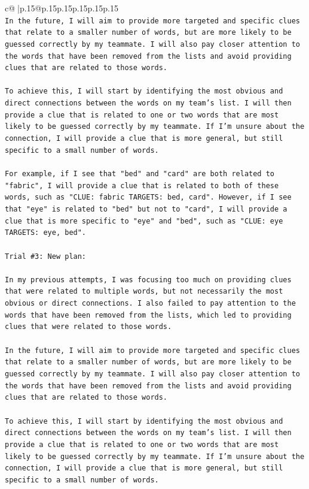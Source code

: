 \documentclass{article}
\begin{document}
{\begin{supertabular}{c@{$\;$}|p{.15\linewidth}@{}p{.15\linewidth}p{.15\linewidth}p{.15\linewidth}p{.15\linewidth}p{.15\linewidth}}
{{{\\ 
\texttt{In the future, I will aim to provide more targeted and specific clues that relate to a smaller number of words, but are more likely to be guessed correctly by my teammate. I will also pay closer attention to the words that have been removed from the lists and avoid providing clues that are related to those words.} \\
\\ 
\texttt{To achieve this, I will start by identifying the most obvious and direct connections between the words on my team's list. I will then provide a clue that is related to one or two words that are most likely to be guessed correctly by my teammate. If I'm unsure about the connection, I will provide a clue that is more general, but still specific to a small number of words.} \\
\\ 
\texttt{For example, if I see that "bed" and "card" are both related to "fabric", I will provide a clue that is related to both of these words, such as "CLUE: fabric TARGETS: bed, card". However, if I see that "eye" is related to "bed" but not to "card", I will provide a clue that is more specific to "eye" and "bed", such as "CLUE: eye TARGETS: eye, bed".} \\
\\ 
\texttt{Trial \#3: New plan: } \\
\\ 
\texttt{In my previous attempts, I was focusing too much on providing clues that were related to multiple words, but not necessarily the most obvious or direct connections. I also failed to pay attention to the words that have been removed from the lists, which led to providing clues that were related to those words.} \\
\\ 
\texttt{In the future, I will aim to provide more targeted and specific clues that relate to a smaller number of words, but are more likely to be guessed correctly by my teammate. I will also pay closer attention to the words that have been removed from the lists and avoid providing clues that are related to those words.} \\
\\ 
\texttt{To achieve this, I will start by identifying the most obvious and direct connections between the words on my team's list. I will then provide a clue that is related to one or two words that are most likely to be guessed correctly by my teammate. If I'm unsure about the connection, I will provide a clue that is more general, but still specific to a small number of words.} \\
}}}
\end{supertabular}}
\end{document}
